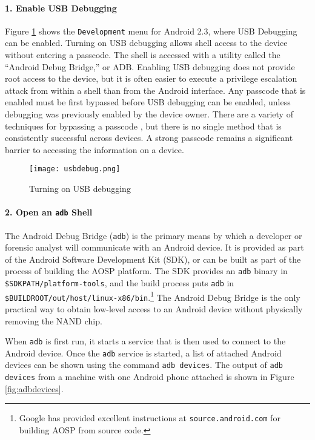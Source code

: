 \paragraph {1. 
Enable USB Debugging} Figure \ref{fig:usbdebug} shows the \texttt{Development} menu for Android 2.3, where USB Debugging can be
enabled.  Turning on USB debugging allows shell access to the device without entering a passcode. The shell is accessed with a
utility called the ``Android Debug Bridge,'' or ADB. Enabling USB debugging does not provide root access to the device, but it is
often easier to execute a privilege escalation attack from within a shell than from the Android interface. Any passcode that is
enabled must be first bypassed before USB debugging can be enabled, unless debugging was previously enabled by the device owner.
There are a variety of techniques for bypassing a passcode \cite{hoog, lockscreenbypass0, lockscreenbypass1, lockscreenbypass2}, but
there is no single method that is consistently successful across devices.  A strong passcode remains a significant barrier to
accessing the information on a device.

\begin{figure}[htpb]
\caption{Turning on USB debugging}
\begin{center}\texttt{[image: usbdebug.png]}\end{center}
\label{fig:usbdebug}
\end{figure}

\paragraph {2. Open an \texttt{adb}  Shell}

The Android Debug Bridge (\texttt{adb}) is the primary means by which a developer or forensic analyst will communicate with an
Android device. It is provided as part of the Android Software Development Kit (SDK), or can be built as part of the process of
building the AOSP platform. The SDK provides an \texttt{adb} binary in \texttt{\$SDKPATH/platform-tools}, and the build process puts
\texttt{adb} in \texttt{\$BUILDROOT/out/host/linux-x86/bin}.\footnote{Google has provided excellent instructions at
\texttt{source.android.com} for building AOSP from source code.}  The Android Debug Bridge is the only practical way to obtain
low-level access to an Android device without physically removing the NAND chip.

When \texttt{adb} is first run, it starts a service that is then used to connect to the Android device. 
Once the \texttt{adb} service is started, a list of attached Android devices can be shown using the command \texttt{adb devices}. 
The output of \texttt{adb devices} from a machine with one Android phone attached is shown in Figure \ref{fig:adbdevices}.

